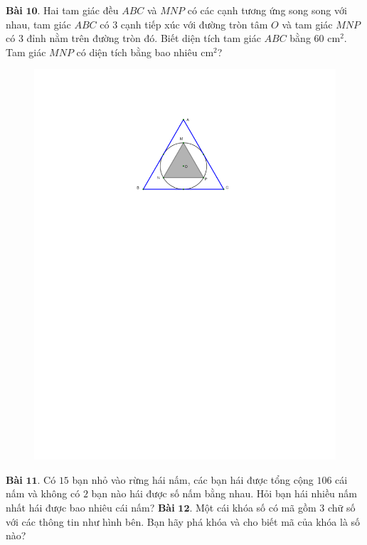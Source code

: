 \begin{multicols}{2}
\begin{figure}[H]
	\end{figure}
	\textbf{\color{toancuabi}Bài} $\pmb{10.}$ Hai tam giác đều $ABC$ và $MNP$ có
	các cạnh tương ứng song song với nhau, tam giác $ABC$ có $3$ cạnh tiếp xúc với đường tròn tâm $O$ và tam giác $MNP$ có $3$ đỉnh nằm trên đường tròn đó. Biết diện tích tam giác $ABC$ bằng $60$ cm$^2$. Tam giác $MNP$ có diện tích
	bằng bao nhiêu cm$^2$?
	\begin{figure}[H]
		\vspace*{-5pt}
		\centering
		\captionsetup{labelformat= empty, justification=centering}
		\includegraphics[width= 0.7\linewidth]{bai10k2}
		\vspace*{-10pt}
	\end{figure}
	\textbf{\color{toancuabi}Bài} $\pmb{11.}$ Có $15$ bạn nhỏ vào rừng hái nấm, các bạn hái được tổng cộng $106$ cái nấm và không có $2$ bạn nào hái được số nấm bằng nhau. Hỏi bạn hái nhiều nấm nhất hái được bao nhiêu cái nấm?
	\vskip 0.1cm
	\textbf{\color{toancuabi}Bài} $\pmb{12.}$ Một cái khóa số có mã gồm $3$ chữ số với các thông tin như hình bên. Bạn hãy phá khóa và cho biết mã của khóa là số nào?
	\begin{figure}[H]
		\vspace*{-5pt}
		\centering
		\captionsetup{labelformat= empty, justification=centering}

\end{figure}
\end{multicols}
